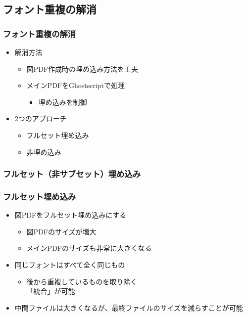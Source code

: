 \documentclass[unicode,17pt]{beamer}
\begin{document}
\subsection{フォント重複の解消}
\begin{frame}\frametitle{フォント重複の解消}
  \begin{itemize}
  \item 解消方法
    \begin{itemize}
    \item 図PDF作成時の埋め込み方法を工夫
    \item メインPDFをGhostscriptで処理
      \begin{itemize}
      \item 埋め込みを制御
      \end{itemize}
    \end{itemize}
  \item 2つのアプローチ
    \begin{itemize}
    \item フルセット埋め込み
    \item 非埋め込み
    \end{itemize}
  \end{itemize}
\end{frame}

\subsubsection{フルセット（非サブセット）埋め込み}
\begin{frame}\frametitle{フルセット埋め込み}
  \begin{itemize}
  \item 図PDFをフルセット埋め込みにする
    \begin{itemize}
    \item 図PDFのサイズが増大
    \item メインPDFのサイズも非常に大きくなる
    \end{itemize}
  \item 同じフォントはすべて全く同じもの
    \begin{itemize}
    \item 後から重複しているものを取り除く\\
      「統合」が可能
    \end{itemize}
  \item 中間ファイルは大きくなるが、最終ファイルのサイズを減らすことが可能
  \end{itemize}
\end{frame}
\end{document}
